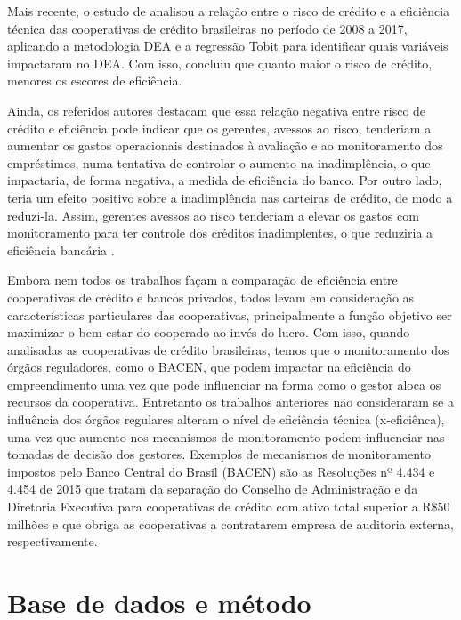 \documentclass[ppgcc]{fearp}
\begin{document}
Mais recente, o estudo de  analisou a relação entre o risco de crédito e a eficiência técnica das cooperativas de crédito brasileiras no período de 2008 a 2017, aplicando a metodologia DEA e a regressão Tobit para identificar quais variáveis impactaram no DEA. Com isso, concluiu que quanto maior o risco de crédito, menores os escores de eficiência. 

Ainda, os referidos autores destacam que essa relação negativa entre risco de crédito e eficiência pode indicar que os gerentes, avessos ao risco, tenderiam a aumentar os gastos operacionais destinados à avaliação e ao monitoramento dos empréstimos, numa tentativa de controlar o aumento na inadimplência, o que impactaria, de forma negativa, a medida de eficiência do banco. Por outro lado, teria um efeito positivo sobre a inadimplência nas carteiras de crédito, de modo a reduzi-la. Assim, gerentes avessos ao risco tenderiam
a elevar os gastos com monitoramento para ter controle dos créditos inadimplentes, o que reduziria a eficiência bancária \cite{tabakcraveirocajueiro2010}.

Embora nem todos os trabalhos façam a comparação de eficiência entre cooperativas de crédito e bancos privados, todos levam em consideração as características particulares das cooperativas, principalmente a função objetivo ser  maximizar o bem-estar do cooperado ao invés do lucro. Com isso, quando analisadas as cooperativas de crédito brasileiras, temos que o monitoramento dos órgãos reguladores, como o BACEN, que podem impactar na eficiência do empreendimento uma vez que pode influenciar na forma como o gestor aloca os recursos da cooperativa. 
Entretanto os trabalhos anteriores não consideraram se a influência dos órgãos regulares alteram o nível de eficiência técnica (x-eficiênca), uma vez que aumento nos mecanismos de monitoramento podem influenciar nas tomadas de decisão dos gestores. Exemplos de mecanismos de monitoramento impostos pelo Banco Central do Brasil (BACEN) são as Resoluções nº 4.434  e 4.454 de 2015 que tratam da separação do Conselho de Administração e da Diretoria Executiva para cooperativas de crédito com ativo total superior a R\$50 milhões e que obriga as cooperativas a contratarem empresa de auditoria externa, respectivamente. 



\section{Base de dados e método}
\end{document}
